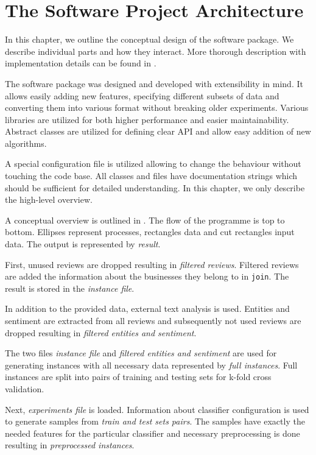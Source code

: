 \chapter{The Software Project Architecture}\label{chap:arch}

In this chapter, we outline the conceptual design of the software package.
We describe individual parts and how they interact.
More thorough description with implementation details can be found in .


The software package was designed and developed with extensibility in mind.
It allows easily adding new features, specifying different subsets of data and converting them into various format without breaking older experiments.
Various libraries are utilized for both higher performance and easier maintainability.
Abstract classes are utilized for defining clear API and allow easy addition of new algorithms.

A special configuration file is utilized allowing to change the behaviour without touching the code base.
All classes and files have documentation strings which should be sufficient for detailed understanding.
In this chapter, we only describe the high-level overview.

A conceptual overview is outlined in .
The flow of the programme is top to bottom.
Ellipses represent processes, rectangles data and cut rectangles input data.
The output is represented by \textit{result}.

First, unused reviews are dropped resulting in \textit{filtered reviews}.
Filtered reviews are added the information about the businesses they belong to in \texttt{join}.
The result is stored in the \textit{instance file}.

In addition to the provided data, external text analysis is used.
Entities and sentiment are extracted from all reviews and
subsequently not used reviews are dropped resulting in \textit{filtered entities and sentiment}.

The two files \textit{instance file} and \textit{filtered entities and sentiment} 
are used for generating instances with all necessary data represented by \textit{full instances}.
Full instances are split into pairs of training and testing sets for k-fold cross validation.

Next, \textit{experiments file} is loaded.
Information about classifier configuration is used to generate samples from \textit{train and test sets pairs}.
The samples have exactly the needed features for the particular classifier and necessary preprocessing is done
resulting in \textit{preprocessed instances}.

